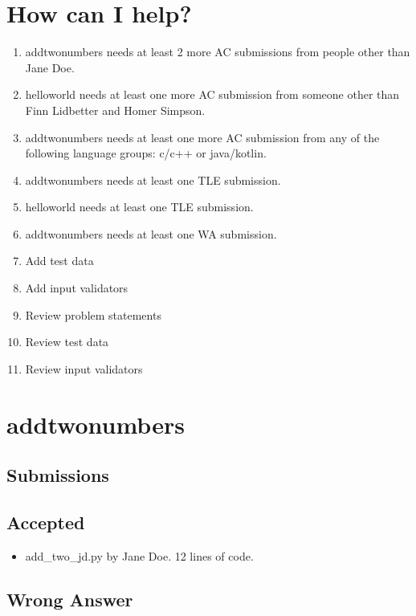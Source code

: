 \documentclass{article}%
\begin{document}
\section{How can I help?}%
\label{sec:HowcanIhelp?}%
\begin{enumerate}%
\item%
addtwonumbers needs at least 2 more AC submissions from people other than Jane Doe.%
\item%
helloworld needs at least one more AC submission from someone other than Finn Lidbetter and Homer Simpson.%
\item%
addtwonumbers needs at least one more AC submission from any of the following language groups: c/c++ or java/kotlin.%
\item%
addtwonumbers needs at least one TLE submission.%
\item%
helloworld needs at least one TLE submission.%
\item%
addtwonumbers needs at least one WA submission.%
\item%
Add test data%
\item%
Add input validators%
\item%
Review problem statements%
\item%
Review test data%
\item%
Review input validators%
\end{enumerate}

%
\newpage%
\section{addtwonumbers}%
\label{sec:addtwonumbers}%
\subsection{Submissions}%
\label{subsec:Submissions}%
\subsection{Accepted}%
\label{subsec:Accepted}%
\begin{itemize}%
\item%
add\_two\_jd.py by Jane Doe. 12 lines of code.%
\end{itemize}

%
\subsection{Wrong Answer}%
\label{subsec:WrongAnswer}%
\end{document}
